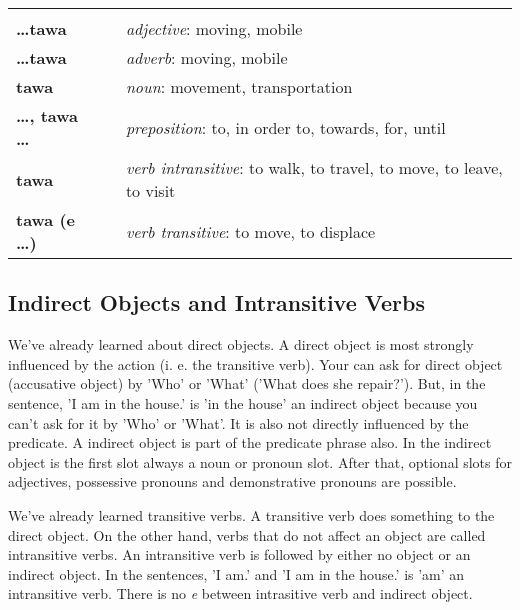 \begin{supertabular}{p{2,5cm}|ll}
                                   &  &                                                                                             \\
    \textbf{\dots tawa}            &  & \textit{adjective}: moving, mobile                                                          \\
    \textbf{\dots tawa}            &  & \textit{adverb}: moving, mobile                                                             \\
    \textbf{tawa}                  &  & \textit{noun}: movement, transportation                                                     \\
    \textbf{\dots , tawa \dots}    &  & \textit{preposition}: to, in order to, towards, for, until                                  \\
    \textbf{tawa}                  &  & \textit{verb intransitive}: to walk, to travel, to move, to leave, to visit                 \\
    \textbf{tawa (e \dots)}        &  & \textit{verb transitive}: to move, to displace                                              \\
\end{supertabular}

\newpage

\subsection*{Indirect Objects and Intransitive Verbs}
We've already learned about direct objects.
A direct object is most strongly influenced by the action (i. e. the transitive verb).
Your can ask for direct object (accusative object) by 'Who' or 'What' ('What does she repair?').
But, in the sentence, 'I am in the house.' is 'in the house' an indirect object because you can't ask for it by 'Who' or 'What'.
It is also not directly influenced by the predicate.
A indirect object is part of the predicate phrase also.
In the indirect object is the first slot always a noun or pronoun slot.
After that, optional slots for adjectives, possessive pronouns and demonstrative pronouns are possible.

We've already learned transitive verbs.
A transitive verb does something to the direct object.
On the other hand, verbs that do not affect an object are called intransitive verbs.
An intransitive verb is followed by either no object or an indirect object.
In the sentences, 'I am.' and 'I am in the house.' is 'am' an intransitive verb.
There is no \textit{e} between intrasitive verb and indirect object.

